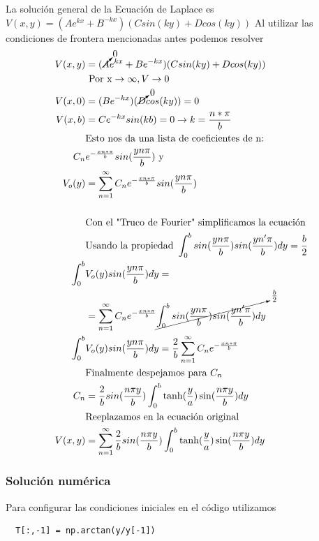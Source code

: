 \documentclass[10pt,journal,compsoc]{IEEEtran}
\begin{document}
La solución general de la Ecuación de Laplace es \(V(x,y)=(Ae^{kx}+B^{-kx})(C sin(ky) + D cos(ky))\)
Al utilizar las condiciones de frontera mencionadas antes podemos resolver
\begin{align*}
  V(x,y)&=(\cancelto{0}{A}e^{kx}+Be^{-kx})(C sin(ky) + D cos(ky))\\
  &\text{ Por x} \to \infty, V \to 0\\
  V(x,0)&=(Be^{-kx}) (\cancelto{0}{D}cos(ky)) = 0\\
  V(x,b)&=Ce^{-kx}sin(kb) = 0 \to k=\frac{n*\pi}{b}\\
  &\text{Esto nos da una lista de coeficientes de n:}\\
  C_{n} &e^{-\frac{xn*\pi}{b}} sin(\frac{yn\pi}{b}) \text{ y }\\
  V_o(y)&= \sum_{n=1}^{\infty} C_{n} e^{-\frac{xn*\pi}{b}} sin(\frac{yn\pi}{b})\\\\
  &\text{Con el "Truco de Fourier" simplificamos la ecuación}\\
  &\text{Usando la propiedad } \int_{0}^b  sin(\frac{yn\pi}{b}) sin(\frac{yn'\pi}{b})dy = \frac{b}{2}\\
  \int_{0}^b&V_o(y)sin(\frac{yn\pi}{b})dy=\\
  &=\sum_{n=1}^{\infty} C_{n} e^{-\frac{xn*\pi}{b}} \cancelto{\frac{b}{2}}{\int_{0}^b sin(\frac{yn\pi}{b}) sin(\frac{yn'\pi}{b})dy}\\
  \int_{0}^b&V_o(y)sin(\frac{yn\pi}{b})dy=\frac{2}{b} \sum_{n=1}^{\infty} C_{n} e^{-\frac{xn*\pi}{b}}\\
  &\text{Finalmente despejamos para \(C_n\)}\\
  C_n &= \frac{2}{b} sin(\frac{n\pi y}{b}) \int_0^b \tanh(\frac{y}{a})\sin(\frac{n\pi y}{b}) dy\\
  &\text{Reeplazamos en la ecuación original}\\
  V(x,y)&=\sum_{n=1}^{\infty} \frac{2}{b} sin(\frac{n\pi y}{b}) \int_0^b \tanh(\frac{y}{a})\sin(\frac{n\pi y}{b}) dy\\
\end{align*}

\subsubsection{Solución numérica}

Para configurar las condiciones iniciales en el código utilizamos
\begin{lstlisting}
  T[:,-1] = np.arctan(y/y[-1])
\end{lstlisting}
\end{document}

